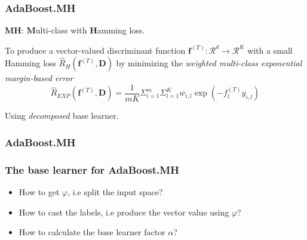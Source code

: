 \documentclass{beamer}
\begin{document}
\begin{frame}
\frametitle{AdaBoost.MH}
\begin{block}{}
\textbf{MH}: \textbf{M}ulti-class with \textbf{H}amming loss.
\end{block}

To produce a vector-valued discriminant function $\mathbf{f}^{(T)} : \mathcal{R}^d \rightarrow \mathcal{R}^K$ with a small Hamming loss $\hat{R}_H (\mathbf{f}^{(T)}, \mathbf{D})$ by minimizing the \textit{weighted multi-class exponential margin-based error}
$$\hat{R}_{EXP}(\mathbf{f}^{(T)}, \mathbf{D}) = \frac{1}{mK} {{\Sigma}_{i=1}^m} {{\Sigma}_{l=1}^K} {w_{i,l}\exp(- f_l^{(T)} y_{i,l})}$$



\begin{block}{}
Using \textit{decomposed} base learner.
\end{block}
\end{frame}

\begin{frame}
\frametitle{AdaBoost.MH}
\begin{algorithm}[H]
\end{algorithm}
\end{frame}

\begin{frame}
\frametitle{The base learner for AdaBoost.MH}
\begin{itemize}
\item How to get $\varphi$, i.e split the input space?
\item How to cast the labels, i.e produce the vector value using  $\varphi$?
\item How to calculate the base learner factor $\alpha$?
\end{itemize}
\end{frame}
\end{document}
